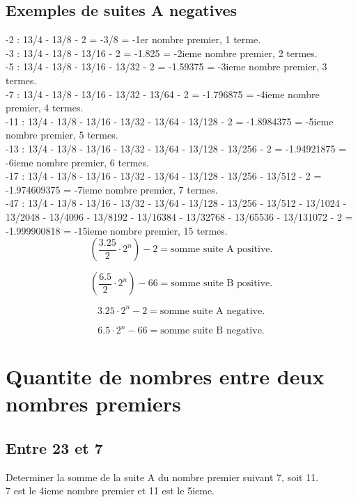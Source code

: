 \documentclass[a4paper,11pt]{article}
\begin{document}
\subsection*{Exemples de suites A negatives}

-2 : 13/4 - 13/8 - 2 = -3/8 = -1er nombre premier, 1 terme.\\
-3 : 13/4 - 13/8 - 13/16 - 2 = -1.825 = -2ieme nombre premier, 2 termes.\\
-5 : 13/4 - 13/8 - 13/16 - 13/32 - 2 = -1.59375 = -3ieme nombre premier, 3 termes.\\
-7 : 13/4 - 13/8 - 13/16 - 13/32 - 13/64 - 2 = -1.796875 = -4ieme nombre premier, 4 termes.\\
-11 : 13/4 - 13/8 - 13/16 - 13/32 - 13/64 - 13/128 - 2 = -1.8984375 = -5ieme nombre premier, 5 termes.\\
-13 : 13/4 - 13/8 - 13/16 - 13/32 - 13/64 - 13/128 - 13/256 - 2 = -1.94921875 = -6ieme nombre premier, 6 termes.\\
-17 : 13/4 - 13/8 - 13/16 - 13/32 - 13/64 - 13/128 - 13/256 - 13/512 - 2 = -1.974609375 = -7ieme nombre premier, 7 termes.\\

-47 : 13/4 - 13/8 - 13/16 - 13/32 - 13/64 - 13/128 - 13/256 - 13/512 - 13/1024 - 13/2048 - 13/4096 - 13/8192 - 13/16384 - 13/32768 - 13/65536 - 13/131072 - 2 = -1.999900818 = -15ieme nombre premier, 15 termes.\\

\[
\left(\frac{3.25}{2} \cdot 2^{n}\right) - 2 = \text{somme suite A positive.}
\]

\[
\left(\frac{6.5}{2} \cdot 2^{n}\right) - 66 = \text{somme suite B positive.}
\]

\[
3.25 \cdot 2^{n} - 2 = \text{somme suite A negative.}
\]

\[
6.5 \cdot 2^{n} - 66 = \text{somme suite B negative.}
\]

\section*{Quantite de nombres entre deux nombres premiers}

\subsection*{Entre 23 et 7}

Determiner la somme de la suite A du nombre premier suivant 7, soit 11.\\
7 est le 4ieme nombre premier et 11 est le 5ieme.
\end{document}
